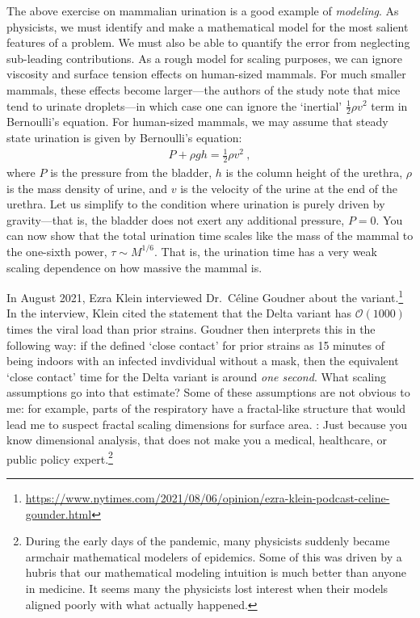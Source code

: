 The above exercise on mammalian urination is a good example of \emph{modeling}. As physicists, we must identify and make a mathematical model for the most salient features of a problem. We must also be able to quantify the error from neglecting sub-leading contributions. As a rough model for scaling purposes, we can ignore viscosity and surface tension effects on human-sized mammals. For much smaller mammals, these effects become larger---the authors of the study note that mice tend to urinate droplets---in which case one can ignore the `inertial' $\frac{1}{2} \rho v^2$ term in Bernoulli's equation. For human-sized mammals, we may assume that steady state urination is given by Bernoulli's equation:
\begin{align}
  P + \rho g h = \frac{1}{2}\rho v^2 \ ,
\end{align}
where $P$ is the pressure from the bladder, $h$ is the column height of the urethra, $\rho$ is the mass density of urine, and $v$ is the velocity of the urine at the end of the urethra. Let us simplify to the condition where urination is purely driven by gravity---that is, the bladder does not exert any additional pressure, $P=0$. You can now show that the total urination time scales like the mass of the mammal to the one-sixth power, $\tau \sim M^{1/6}$. That is, the urination time has a very weak scaling dependence on how massive the mammal is.

\begin{exercise}
In August 2021, Ezra Klein interviewed Dr.~C\'eline Goudner about the  variant.\footnote{\url{https://www.nytimes.com/2021/08/06/opinion/ezra-klein-podcast-celine-gounder.html}} In the interview, Klein cited the statement that the Delta variant has $\mathcal O(1000)$ times the viral load than prior  strains. Goudner then interprets this in the following way: if the  defined `close contact' for prior strains as 15 minutes of being indoors with an infected invdividual without a mask, then the equivalent `close contact' time for the Delta variant is around \emph{one second}. What scaling assumptions go into that estimate? Some of these assumptions are not obvious to me: for example, parts of the respiratory have a fractal-like structure that would lead me to suspect fractal scaling dimensions for surface area. : Just because you know dimensional analysis, that does not make you a medical, healthcare, or public policy expert.\footnote{During the early days of the  pandemic, many physicists suddenly became armchair mathematical modelers of epidemics. Some of this was driven by a hubris that our mathematical modeling intuition is much better than anyone in medicine. It seems many the physicists lost interest when their models aligned poorly with what actually happened.} 
\end{exercise}
 


